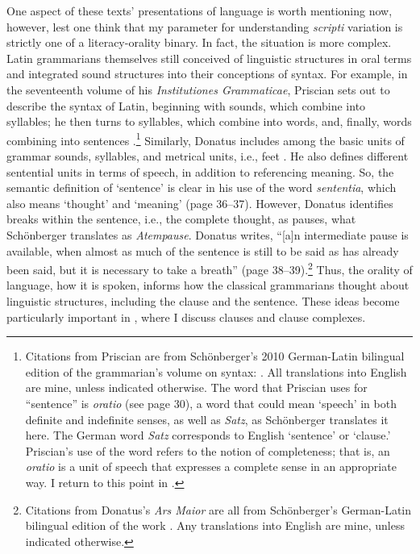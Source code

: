One aspect of these texts’ presentations of language is worth mentioning now, however, lest one think that my parameter for understanding \textit{scripti} variation is strictly one of a literacy-orality binary. In fact, the situation is more complex. Latin grammarians themselves still conceived of linguistic structures in oral terms and integrated sound structures into their conceptions of syntax. For example, in the seventeenth volume of his \textit{Institutiones Grammaticae}, Priscian sets out to describe the syntax of Latin, beginning with sounds, which combine into syllables; he then turns to syllables, which combine into words, and, finally, words combining into sentences \citep[27--31]{Priscian2010}.\footnote{Citations from Priscian are from Schönberger’s 2010 German-Latin bilingual edition of the grammarian’s volume on syntax: \citet{Priscian2010}. All translations into English are mine, unless indicated otherwise. The word that Priscian uses for “sentence” is \textit{oratio} (see page 30), a word that could mean ‘speech’ in both definite and indefinite senses, as well as \textit{Satz}, as Schönberger translates it here. The German word \textit{Satz} corresponds to English ‘sentence’ or ‘clause.’ Priscian’s use of the word refers to the notion of completeness; that is, an \textit{oratio} is a unit of speech that expresses a complete sense in an appropriate way. I return to this point in .} Similarly, Donatus includes among the basic units of grammar sounds, syllables, and metrical units, i.e., feet \citep[15--25]{Donatus2009}. He also defines different sentential units in terms of speech, in addition to referencing meaning. So, the semantic definition of ‘sentence’ is clear in his use of the word \textit{sententia}, which also means ‘thought’ and ‘meaning’ (page 36--37). However, Donatus identifies breaks within the sentence, i.e., the complete thought, as pauses, what Schönberger translates as \textit{Atempause}. Donatus writes, “[a]n intermediate pause is available, when almost as much of the sentence is still to be said as has already been said, but it is necessary to take a breath” (page 38--39).\footnote{\textrm{Citations from Donatus’s} \textrm{\textit{Ars Maior}} \textrm{are all from Schönberger’s  German-Latin bilingual edition of the work \citep{Donatus2009}. Any translations into English are mine, unless indicated otherwise.} } Thus, the orality of language, how it is spoken, informs how the classical grammarians thought about linguistic structures, including the clause and the sentence. These ideas become particularly important in , where I discuss clauses and clause complexes.

